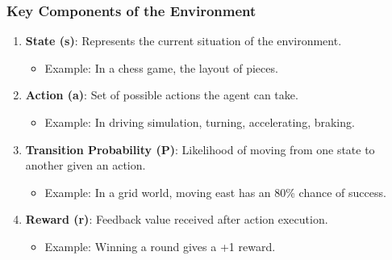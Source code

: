 \documentclass{beamer}
\begin{document}
\begin{frame}[fragile]
    \frametitle{Key Components of the Environment}
    \begin{enumerate}
        \item \textbf{State (s)}: Represents the current situation of the environment.
        \begin{itemize}
            \item Example: In a chess game, the layout of pieces.
        \end{itemize}
        
        \item \textbf{Action (a)}: Set of possible actions the agent can take.
        \begin{itemize}
            \item Example: In driving simulation, turning, accelerating, braking.
        \end{itemize}
        
        \item \textbf{Transition Probability (P)}: Likelihood of moving from one state to another given an action.
        \begin{itemize}
            \item Example: In a grid world, moving east has an 80\% chance of success.
        \end{itemize}
        
        \item \textbf{Reward (r)}: Feedback value received after action execution.
        \begin{itemize}
            \item Example: Winning a round gives a +1 reward.
        \end{itemize}
    \end{enumerate}
\end{frame}
\end{document}
